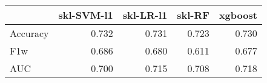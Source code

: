 \begin{tabular}{lrrrr}
\toprule
{} &  skl-SVM-l1 &  skl-LR-l1 &  skl-RF &  xgboost \\
\midrule
Accuracy &       0.732 &      0.731 &   0.723 &    0.730 \\
F1w      &       0.686 &      0.680 &   0.611 &    0.677 \\
AUC      &       0.700 &      0.715 &   0.708 &    0.718 \\
\bottomrule
\end{tabular}
